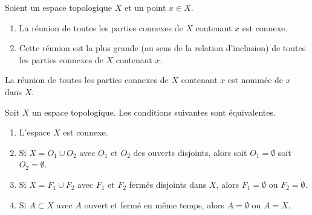 \begin{propositionDef}        \label{DEFooFHXNooJGUPPn}
	Soient un espace topologique \( X\) et un point \( x\in X\).
	\begin{enumerate}
		\item
		      La réunion de toutes les parties connexes de \( X\) contenant \( x\) est connexe.
		\item
		      Cette réunion est la plus grande (au sens de la relation d'inclusion) de toutes les parties connexes de \( X\) contenant \( x\).
	\end{enumerate}
	La réunion de toutes les parties connexes de \( X\) contenant \( x\) est nommée  de \( x\) dans \( X\).
\end{propositionDef}

\begin{proposition} \label{PropHSjJcIr}
	Soit \( X\) un espace topologique. Les conditions suivantes sont équivalentes.
	\begin{enumerate}
		\item       \label{ITEMooXHIKooGqrgTs}
		      L'espace \( X\) est connexe.
		\item       \label{ITEMooRTNPooADKVnw}
		      Si \( X=O_1\cup O_2\) avec \( O_1\) et \( O_2\) des ouverts disjoints, alors soit \( O_1=\emptyset\) soit \( O_2=\emptyset\).
		\item       \label{ITEMooOEZYooFBNaOZ}
		      Si \( X=F_1\cup F_2\) avec \( F_1\) et \( F_2\) fermés disjoints dans \( X\), alors \( F_1=\emptyset\) ou \( F_2=\emptyset\).
		\item       \label{ITEMooNIPZooIDPmEf}
		      Si \( A\subset X\) avec \( A\) ouvert et fermé en même temps, alors \( A=\emptyset\) ou \( A=X\).
	\end{enumerate}
\end{proposition}

